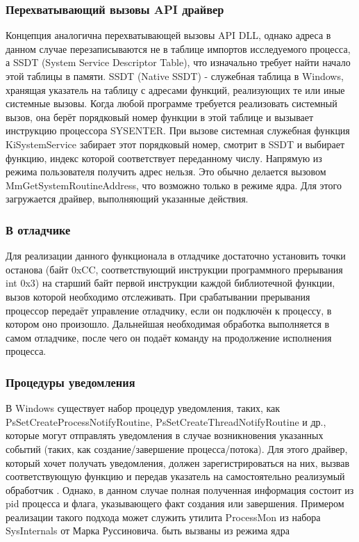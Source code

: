 \subsubsection {Перехватывающий вызовы API драйвер}
 Концепция аналогична перехватывающей вызовы API DLL, однако адреса в данном случае перезаписываются не в таблице импортов исследуемого процесса, а SSDT (System Service Descriptor Table), что изначально требует найти начало этой таблицы в памяти. SSDT (Native SSDT) - служебная таблица в Windows, хранящая указатель на таблицу с адресами функций, реализующих те или иные системные вызовы. Когда любой программе требуется реализовать системный вызов, она берёт порядковый номер функции в этой таблице и вызывает инструкцию процессора SYSENTER.  При вызове системная служебная функция KiSystemService забирает этот порядковый номер, смотрит в SSDT и выбирает функцию, индекс которой соответствует переданному числу.
Напрямую из режима пользователя получить адрес нельзя. Это обычно делается вызовом MmGetSystemRoutineAddress, что возможно только в режиме ядра. Для этого загружается драйвер, выполняющий указанные действия.
\subsubsection {В отладчике}
Для реализации данного функционала в отладчике достаточно установить точки останова (байт 0xCC, соответствующий инструкции программного прерывания int 0x3) на старший байт первой инструкции каждой библиотечной функции, вызов которой необходимо отслеживать. При срабатывании прерывания процессор передаёт управление отладчику, если он подключён к процессу, в котором оно произошло. Дальнейшая необходимая обработка выполняется в самом отладчике, после чего он подаёт команду на продолжение исполнения процесса.
\subsubsection {Процедуры уведомления}
В Windows существует набор процедур уведомления, таких, как\\
PsSetCreateProcessNotifyRoutine, PsSetCreateThreadNotifyRoutine и др., которые могут отправлять уведомления в случае возникновения указанных событий (таких, как создание/завершение процесса/потока). Для этого драйвер, который хочет получать уведомления, должен зарегистрироваться на них, вызвав соответствующую функцию и передав указатель на самостоятельно реализумый обработчик . Однако, в данном случае полная полученная информация состоит из pid процесса и флага, указывающего факт создания или завершения. Примером реализации такого подхода может служить утилита ProcessMon из набора SysInternals от Марка Руссиновича.
быть вызваны из режима ядра
